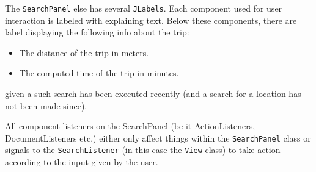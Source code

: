 The \texttt{SearchPanel} else has several \texttt{JLabels}. Each component used for user interaction is labeled with explaining text. Below these components, there are label displaying the following info about the trip:
\begin{itemize}
 \item The distance of the trip in meters.
 \item The computed time of the trip in minutes.
\end{itemize}
given a such search has been executed recently (and a search for a location has not been made since).

All component listeners on the SearchPanel (be it ActionListeners, DocumentListeners etc.) either only affect things within the \texttt{SearchPanel} class or signals to the \texttt{SearchListener} (in this case the \texttt{View} class) to take action according to the input given by the user.

